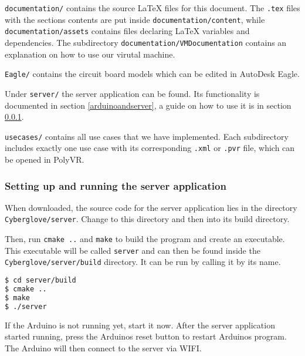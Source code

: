 \texttt{documentation/} contains the source LaTeX files for this document. The \texttt{.tex} files with the sections contents are put inside \texttt{documentation/content}, while \linebreak\texttt{documentation/assets} contains files declaring LaTeX variables and dependencies. The subdirectory \linebreak\texttt{documentation/VMDocumentation} contains an explanation on how to use our virutal machine.

\texttt{Eagle/} contains the circuit board models which can be edited in AutoDesk Eagle.

Under \texttt{server/} the server application can be found. Its functionality is documented in section \ref{arduinoandserver}, a guide on how to use it is in section \ref{howtorunserver}.

\texttt{usecases/} contains all use cases that we have implemented. Each subdirectory includes exactly one use case with its corresponding \texttt{.xml} or \texttt{.pvr} file, which can be opened in PolyVR.

\subsubsection{Setting up and running the server application}
\label{howtorunserver}

When downloaded, the source code for the server application lies in the directory \linebreak \texttt{Cyberglove/server}. Change to this directory and then into its build directory.

Then, run \texttt{cmake ..} and \texttt{make} to build the program and create an executable. This executable will be called \texttt{server} and can then be found inside the \texttt{Cyberglove/server/build} directory. It can be run by calling it by its name.


\begin{lstlisting}[language=bash]
$ cd server/build
$ cmake ..
$ make
$ ./server
\end{lstlisting}

If the Arduino is not running yet, start it now. After the server application started running, press the Arduinos reset button to restart Arduinos program. The Arduino will then connect to the server via WIFI. 


